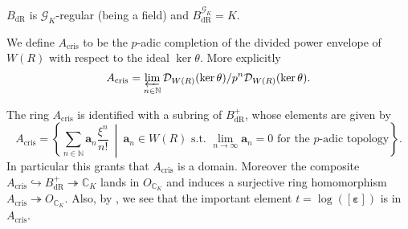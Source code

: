 \begin{prop}
	$B_{\mathrm{dR}}$ is $\mathscr{G}_K$-regular
	(being a field) and $B_{\mathrm{dR}}^{\mathscr{G}_K} = K$.
\end{prop}


\begin{defn}[]
	We define $A_{\mathrm{cris}}$ to be the $p$-adic completion of the
	divided power envelope of $W(R)$ with respect to the ideal $\ker \theta$.
	More explicitly
	\begin{equation*}
		A_{\mathrm{cris}} = \varprojlim_{n \in \mathbb{N}} 
		\mathcal{D}_{W(R)}(\ker\theta)/p^n\mathcal{D}_{W(R)}(\ker\theta)
	.\end{equation*}
\end{defn}


\begin{rem}
	The ring $A_{\mathrm{cris}}$ is identified with a subring
	of $B_{\mathrm{dR}}^+$, whose elements are given by
	\begin{equation*}
	A_{\mathrm{cris}} = 
	\left\{ \sum_{n \in \mathbb{N} }^{  } \mathbf{a}_n \frac{ \xi^n }{ n! } \ \middle|\ 
	\mathbf{a}_n \in W(R) \text{ s.t. } \lim_{n \to \infty} \mathbf{a}_n = 0
	\text{ for the $p$-adic topology}\right\}
	.\end{equation*}
	In particular this grants that $A_{\mathrm{cris}}$ is a domain.
	Moreover the composite $A_{\mathrm{cris}} \hookrightarrow B_{\mathrm{dR}}^+ 
	\twoheadrightarrow \mathbb{C}_K$ lands in $O_{\mathbb{C}_K}$
	and induces a surjective ring homomorphism $A_{\mathrm{cris}} \twoheadrightarrow O_{\mathbb{C}_K}$.
	Also, by {\cite[Proposition 9.1.3]{Brinon}}, we see that the important
	element $t = \log ([\boldsymbol\varepsilon])$ is in $A_{\mathrm{cris}}$.
\end{rem}


